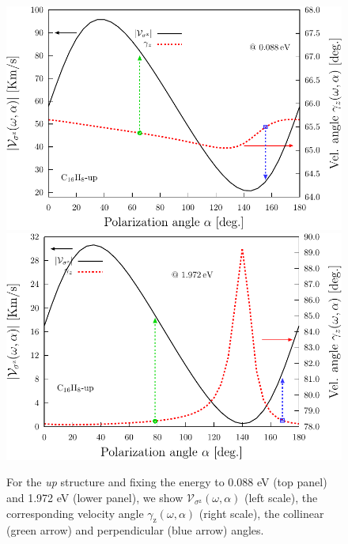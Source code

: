 \documentclass[prb,11pt,tightenlines,twocolumn,aps]{revtex4-1}
\begin{document}
\begin{figure}[t]
    \centering
    \includegraphics[width=\linewidth]{upplots/up-vaz-rag-1}
    \\
    \vspace{4mm}
    \includegraphics[width=\linewidth]{upplots/up-vaz-rag-2}

    \caption{For the {\it up} structure and  fixing the energy to
      0.088 eV (top panel) and 1.972 eV (lower panel), 
  we show 
    $\mathcal{V}_{\sigma^{\mathrm{z}}}(\omega,\alpha)$ (left
    scale), the corresponding velocity angle
    $\gamma_{\mathrm{z}}(\omega,\alpha)$ (right scale), the
    collinear (green arrow) and perpendicular (blue arrow) angles.
}
    \label{fig:up-vaz-rag}
\end{figure}

\end{document}
